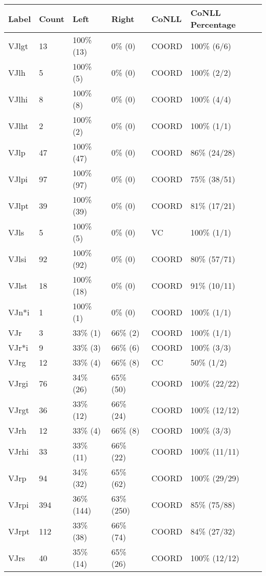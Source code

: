 \begin{figure*}
\begin{tabular}{|l|l|l|l||l|l|}
\hline
Label & Count & Left & Right & CoNLL & CoNLL Percentage\\ 
\hline
 VJlgt & 13 & 100\% (13) & 0\% (0) & COORD & 100\% (6/6) \\ 
\hline
 VJlh & 5 & 100\% (5) & 0\% (0) & COORD & 100\% (2/2) \\ 
\hline
 VJlhi & 8 & 100\% (8) & 0\% (0) & COORD & 100\% (4/4) \\ 
\hline
 VJlht & 2 & 100\% (2) & 0\% (0) & COORD & 100\% (1/1) \\ 
\hline
 VJlp & 47 & 100\% (47) & 0\% (0) & COORD & 86\% (24/28) \\ 
\hline
 VJlpi & 97 & 100\% (97) & 0\% (0) & COORD & 75\% (38/51) \\ 
\hline
 VJlpt & 39 & 100\% (39) & 0\% (0) & COORD & 81\% (17/21) \\ 
\hline
 VJls & 5 & 100\% (5) & 0\% (0) & VC & 100\% (1/1) \\ 
\hline
 VJlsi & 92 & 100\% (92) & 0\% (0) & COORD & 80\% (57/71) \\ 
\hline
 VJlst & 18 & 100\% (18) & 0\% (0) & COORD & 91\% (10/11) \\ 
\hline
 VJn*i & 1 & 100\% (1) & 0\% (0) & COORD & 100\% (1/1) \\ 
\hline
 VJr & 3 & 33\% (1) & 66\% (2) & COORD & 100\% (1/1) \\ 
\hline
 VJr*i & 9 & 33\% (3) & 66\% (6) & COORD & 100\% (3/3) \\ 
\hline
 VJrg & 12 & 33\% (4) & 66\% (8) & CC & 50\% (1/2) \\ 
\hline
 VJrgi & 76 & 34\% (26) & 65\% (50) & COORD & 100\% (22/22) \\ 
\hline
 VJrgt & 36 & 33\% (12) & 66\% (24) & COORD & 100\% (12/12) \\ 
\hline
 VJrh & 12 & 33\% (4) & 66\% (8) & COORD & 100\% (3/3) \\ 
\hline
 VJrhi & 33 & 33\% (11) & 66\% (22) & COORD & 100\% (11/11) \\ 
\hline
 VJrp & 94 & 34\% (32) & 65\% (62) & COORD & 100\% (29/29) \\ 
\hline
 VJrpi & 394 & 36\% (144) & 63\% (250) & COORD & 85\% (75/88) \\ 
\hline
 VJrpt & 112 & 33\% (38) & 66\% (74) & COORD & 84\% (27/32) \\ 
\hline
 VJrs & 40 & 35\% (14) & 65\% (26) & COORD & 100\% (12/12) \\ 

\end{tabular}
\end{figure*}
